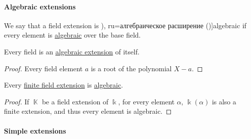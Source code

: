 \paragraph{Algebraic extensions}

\begin{definition}\label{def:algebraic_extension}
  We say that a field extension is \term[bg=алгебрично разширение (\cite[201]{ГеновМиховскиМоллов1991Алгебра}), ru=алгебраическое расширение (\cite[408]{Винберг2014КурсАлгебры})]{algebraic} if every element is \hyperref[def:algebraic_element]{algebraic} over the base field.
\end{definition}

\begin{proposition}\label{thm:field_is_algebraic_over_itself}
  Every field is an \hyperref[def:algebraic_extension]{algebraic extension} of itself.
\end{proposition}
\begin{proof}
  Every field element \( a \) is a root of the polynomial \( X - a \).
\end{proof}

\begin{proposition}\label{thm:finite_field_extensions_are_algebraic}
  Every \hyperref[def:field_extension_degree]{finite field extension} is \hyperref[def:algebraic_extension]{algebraic}.
\end{proposition}
\begin{proof}
  If \( \BbbK \) be a field extension of \( \Bbbk \), for every element \( \alpha \), \( \Bbbk(\alpha) \) is also a finite extension, and thus every element is algebraic.
\end{proof}

\paragraph{Simple extensions}

